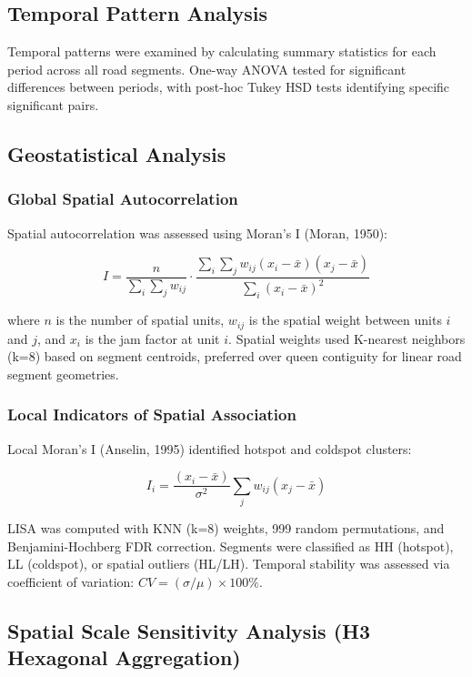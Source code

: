 \documentclass[12pt,a4paper]{article}
\begin{document}
\subsection{Temporal Pattern Analysis}

Temporal patterns were examined by calculating summary statistics for each period across all road segments. One-way ANOVA tested for significant differences between periods, with post-hoc Tukey HSD tests identifying specific significant pairs.

\subsection{Geostatistical Analysis}

\subsubsection{Global Spatial Autocorrelation}

Spatial autocorrelation was assessed using Moran's I (Moran, 1950):

\[I = \frac{n}{\sum_i \sum_j w_{ij}} \cdot \frac{\sum_i \sum_j w_{ij}(x_i - \bar{x})(x_j - \bar{x})}{\sum_i (x_i - \bar{x})^2}\]

where $n$ is the number of spatial units, $w_{ij}$ is the spatial weight between units $i$ and $j$, and $x_i$ is the jam factor at unit $i$. Spatial weights used K-nearest neighbors (k=8) based on segment centroids, preferred over queen contiguity for linear road segment geometries.

\subsubsection{Local Indicators of Spatial Association}

Local Moran's I (Anselin, 1995) identified hotspot and coldspot clusters:

\[I_i = \frac{(x_i - \bar{x})}{\sigma^2} \sum_j w_{ij}(x_j - \bar{x})\]

LISA was computed with KNN (k=8) weights, 999 random permutations, and Benjamini-Hochberg FDR correction. Segments were classified as HH (hotspot), LL (coldspot), or spatial outliers (HL/LH). Temporal stability was assessed via coefficient of variation: $CV = (\sigma/\mu) \times 100\%$.

\subsection{Spatial Scale Sensitivity Analysis (H3 Hexagonal Aggregation)}
\label{sec:method_h3}
\end{document}
